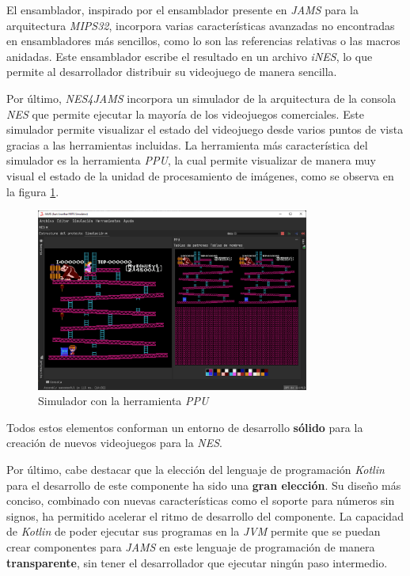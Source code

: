El ensamblador, inspirado por el ensamblador presente
en \textit{JAMS} para la arquitectura \textit{MIPS32},
incorpora varias características avanzadas no encontradas
en ensambladores más sencillos, como lo son las referencias
relativas o las macros anidadas.
Este ensamblador escribe el resultado en un archivo \textit{iNES},
lo que permite al desarrollador distribuir su videojuego de manera
sencilla.

Por último, \textit{NES4JAMS} incorpora un simulador de la arquitectura
de la consola \textit{NES} que permite ejecutar la mayoría de los
videojuegos comerciales.
Este simulador permite visualizar el estado del videojuego desde varios
puntos de vista gracias a las herramientas incluidas.
La herramienta más característica del simulador es la herramienta
\textit{PPU}, la cual permite visualizar de manera muy visual el estado
de la unidad de procesamiento de imágenes,
como se observa en la figura \ref{fig:nes-result-simulator}.

\begin{figure}[h]
    \centering
    \includegraphics[width=0.8\textwidth]{images/results/nes-simulator}
    \caption{Simulador con la herramienta \textit{PPU}}
    \label{fig:nes-result-simulator}
\end{figure}

Todos estos elementos conforman un entorno de desarrollo
\textbf{sólido} para la creación de nuevos videojuegos
para la \textit{NES}.

Por último, cabe destacar que la elección del lenguaje
de programación \textit{Kotlin} para el desarrollo de
este componente ha sido una \textbf{gran elección}.
Su diseño más conciso, combinado con nuevas características
como el soporte para números sin signos, ha permitido
acelerar el ritmo de desarrollo del componente.
La capacidad de \textit{Kotlin} de poder ejecutar sus
programas en la \textit{JVM} permite que se puedan
crear componentes para \textit{JAMS} en este lenguaje
de programación de manera \textbf{transparente}, sin
tener el desarrollador que ejecutar ningún paso intermedio.